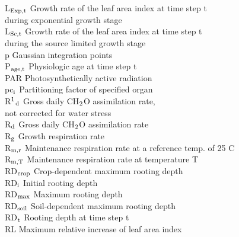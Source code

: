 \documentclass[11pt]{article}
\begin{document}
\begin{tabbing}
L$_{{\rm Exp,t}}$\> \> Growth rate of the leaf area index at time step t\\
\>\> during exponential growth stage\> \> \> \> \> \> \> \> [ha ha$^{{\rm -1}}$ d$^{{\rm -1}}$]\\
L$_{{\rm Sc,t}}$\> \> Growth rate of the leaf area index at time step t\\
\>\> during the source limited growth stage\> \> \> \> \> \> \> \> [ha ha$^{{\rm -1}}$ d$^{{\rm -1}}$]\\
 p\> \> Gaussian integration points\> \> \> \> \> \> \> \> [-]\\
P$_{{\rm age,t}}$\> \> Physiologic age at time step t\> \> \> \> \> \> \> \> [d]\\
PAR\> \> Photosynthetically active radiation\> \> \> \> \> \> \> \> [J m$^{{\rm -2}}$ d$^{{\rm -1}}$]\\
pc$_{{\rm i}}$\> \> Partitioning factor of specified organ\> \> \> \> \> \> \> \> [kg kg$^{{\rm -1}}$]\\
R$^{{\rm 1}}$$_{{\rm d}}$\> \> Gross daily CH$_{{\rm 2}}$O assimilation rate,\\
\>\> not corrected for water stress\> \> \> \> \> \> \> \> [kg ha$^{{\rm -1}}$ d$^{{\rm -1}}$]\\
R$_{{\rm d}}$\> \> Gross daily CH$_{{\rm 2}}$O assimilation rate\> \> \> \> \> \> \> \> [kg ha$^{{\rm -1}}$ d$^{{\rm -1}}$]\\
R$_{{\rm g}}$\> \> Growth respiration rate\> \> \> \> \> \> \> \> [kg ha$^{{\rm -1}}$ d$^{{\rm -1}}$]\\
R$_{{\rm m,r}}$\> \> Maintenance respiration rate at a reference temp. of 25 \degrees C\> \> \> \> \> \> \> \> [kg ha$^{{\rm -1}}$ d$^{{\rm -1}}$]\\
R$_{{\rm m,T}}$\> \> Maintenance respiration rate at temperature T\> \> \> \> \> \> \> \> [kg ha$^{{\rm -1}}$ d$^{{\rm -1}}$]\\
RD$_{{\rm crop}}$\> \> Crop-dependent maximum rooting depth\> \> \> \> \> \> \> \> [cm]\\
RD$_{{\rm i}}$ \> \> Initial rooting depth\> \> \> \> \> \> \> \> [cm]\\
RD$_{{\rm max}}$\> \> Maximum rooting depth\> \> \> \> \> \> \> \> [cm]\\
RD$_{{\rm soil}}$\> \> Soil-dependent maximum rooting depth\> \> \> \> \> \> \> \> [cm]\\
RD$_{{\rm t}}$\> \> Rooting depth at time step t\> \> \> \> \> \> \> \> [cm]\\
RL\> \> Maximum relative increase of leaf area index \> \> \> \> \> \> \> \> [\degrees C$^{{\rm -1}}$ d$^{{\rm -1}}$]\\
$$
\end{tabbing}
\end{document}

